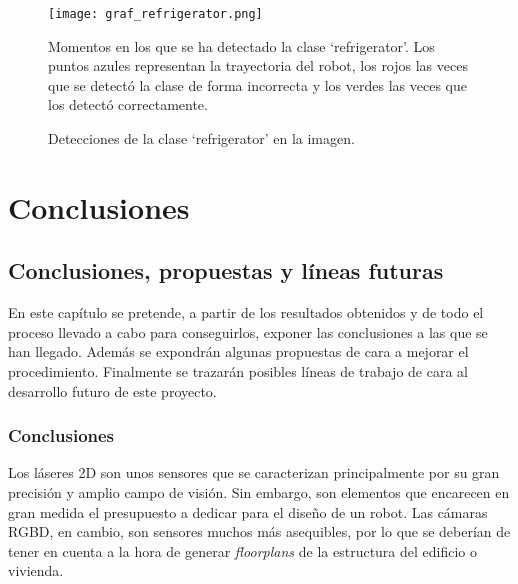 \begin{figure}[h]
	\begin{center} 
		\texttt{[image: graf\_refrigerator.png]}
	\end{center}
	\caption{Momentos en los que se ha detectado la clase `refrigerator'. Los puntos azules representan la trayectoria del robot, los rojos las veces que se detectó la clase de forma incorrecta y los verdes las veces que los detectó correctamente.}
	\label{fig:graf_refrigerator}
\end{figure}

\begin{figure}[H]
 \centering
  \hspace{0.5cm}
 \caption{Detecciones de la clase `refrigerator' en la imagen.}
 \label{fig:det_refrigerator}
\end{figure}

\part{Conclusiones}

\chapter{Conclusiones, propuestas y líneas futuras}

En este capítulo se pretende, a partir de los resultados obtenidos y de todo el proceso llevado a cabo para conseguirlos, exponer las conclusiones a las que se han llegado. Además se expondrán algunas propuestas de cara a mejorar el procedimiento. Finalmente se trazarán posibles líneas de trabajo de cara al desarrollo futuro de este proyecto.\\

\section{Conclusiones}

Los láseres 2D son unos sensores que se caracterizan principalmente por su gran precisión y amplio campo de visión. Sin embargo, son elementos que encarecen en gran medida el presupuesto a dedicar para el diseño de un robot. Las cámaras RGBD, en cambio, son sensores muchos más asequibles, por lo que se deberían de tener en cuenta a la hora de generar \textit{floorplans} de la estructura del edificio o vivienda.\\

